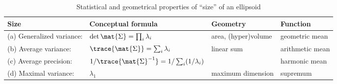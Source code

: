 \begin{table}[!htb]
\caption{Statistical and geometrical properties of ``size'' of an ellipsoid}\label{tab:ell-size}
\begin{tabular}{llll}
Size                   &  Conceptual formula                    & Geometry       & Function \\
\hline
(a) Generalized variance:  & $\det{\mat{\Sigma}} = \prod_i \lambda_i$ & area, (hyper)volume & geometric mean\\  
(b) Average variance:        & $\trace{\mat{\Sigma}} = \sum_i \lambda_i $ & linear sum & arithmetic mean\\     %
(c) Average precision:        & $1/ \trace{\mat{\Sigma}^{-1}} = 1/\sum_i (1/\lambda_i) $ &  & harmonic mean\\
(d) Maximal variance:      & $\lambda_1$ & maximum dimension & supremum
\end{tabular}
\end{table}
